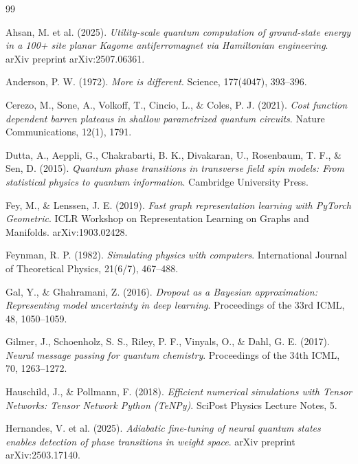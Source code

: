 \documentclass[11pt,a4paper,spanish]{book}
\begin{document}
\begin{thebibliography}{99}

 Ahsan, M. et al. (2025). \emph{Utility-scale quantum computation of ground-state energy in a 100+ site planar Kagome antiferromagnet via Hamiltonian engineering}. arXiv preprint arXiv:2507.06361.

 Anderson, P. W. (1972). \emph{More is different}. Science, 177(4047), 393--396.

 Cerezo, M., Sone, A., Volkoff, T., Cincio, L., \& Coles, P. J. (2021). \emph{Cost function dependent barren plateaus in shallow parametrized quantum circuits}. Nature Communications, 12(1), 1791.

 Dutta, A., Aeppli, G., Chakrabarti, B. K., Divakaran, U., Rosenbaum, T. F., \& Sen, D. (2015). \emph{Quantum phase transitions in transverse field spin models: From statistical physics to quantum information}. Cambridge University Press.

 Fey, M., \& Lenssen, J. E. (2019). \emph{Fast graph representation learning with PyTorch Geometric}. ICLR Workshop on Representation Learning on Graphs and Manifolds. arXiv:1903.02428.

 Feynman, R. P. (1982). \emph{Simulating physics with computers}. International Journal of Theoretical Physics, 21(6/7), 467--488.

 Gal, Y., \& Ghahramani, Z. (2016). \emph{Dropout as a Bayesian approximation: Representing model uncertainty in deep learning}. Proceedings of the 33rd ICML, 48, 1050--1059.

 Gilmer, J., Schoenholz, S. S., Riley, P. F., Vinyals, O., \& Dahl, G. E. (2017). \emph{Neural message passing for quantum chemistry}. Proceedings of the 34th ICML, 70, 1263--1272.

 Hauschild, J., \& Pollmann, F. (2018). \emph{Efficient numerical simulations with Tensor Networks: Tensor Network Python (TeNPy)}. SciPost Physics Lecture Notes, 5.

 Hernandes, V. et al. (2025). \emph{Adiabatic fine-tuning of neural quantum states enables detection of phase transitions in weight space}. arXiv preprint arXiv:2503.17140.


\end{thebibliography}
\end{document}
